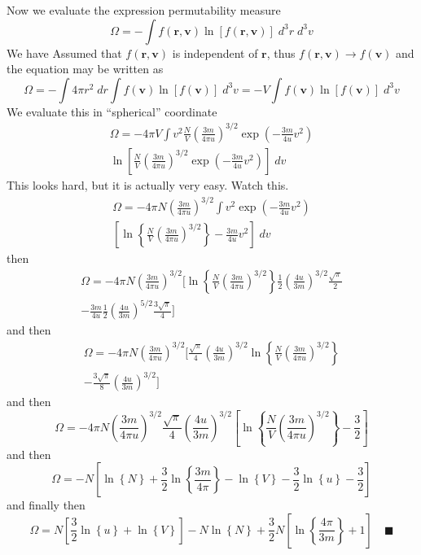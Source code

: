 \documentclass[../../../Main.tex]{subfiles}
\begin{document}
Now we evaluate the expression permutability measure
\begin{equation*}
    \Omega=-\int f(\mathbf{r},\mathbf{v})\ln [f(\mathbf{r},\mathbf{v})]\;d^3r\;d^3v
\end{equation*}
We have Assumed that $f(\mathbf{r},\mathbf{v})$ is independent of $\mathbf{r}$, thus $f(\mathbf{r},\mathbf{v})\rightarrow f(\mathbf{v})$ and the equation may be written as
\begin{equation*}
    \Omega=-\int 4\pi r^2\;dr\int  f( \mathbf{v})\ln [f( \mathbf{v})]\;d^3v=-V\int  f( \mathbf{v}) \ln [f( \mathbf{v})]\;d^3v
\end{equation*}
We evaluate this in \enquote{spherical} coordinate
\begin{multline*}
    \Omega=-4\pi V\int v^2 \frac{N}{V} \left(\frac{3m}{4\pi u}\right)^{3/2}\exp\left(-\frac{3m}{4u}v^2\right)\\
     \ln \left[\frac{N}{V} \left(\frac{3m}{4\pi u}\right)^{3/2}\exp\left(-\frac{3m}{4u}v^2\right)\right]\;dv
\end{multline*}
This looks hard, but it is actually very easy. Watch this.
\begin{multline*}
    \Omega=-4\pi N \left(\frac{3m}{4\pi u}\right)^{3/2}\int v^2 \exp\left(-\frac{3m}{4u}v^2\right)\\
      \left[\ln\left\{\frac{N}{V} \left(\frac{3m}{4\pi u}\right)^{3/2}\right\} -\frac{3m}{4u}v^2\right]\;dv
\end{multline*}
then
\begin{multline*}
    \Omega=-4\pi N \left(\frac{3m}{4\pi u}\right)^{3/2}\Bigg[ \ln\left\{\frac{N}{V} \left(\frac{3m}{4\pi u}\right)^{3/2}\right\} \frac{1}{2}\left(\frac{4u}{3m}\right)^{3/2}\frac{\sqrt{\pi}}{2}\\
    -\frac{3m}{4u}\frac{1}{2}\left(\frac{4u}{3m}\right)^{5/2}\frac{3\sqrt{\pi}}{4}\Bigg]
\end{multline*}
and then
\begin{multline*}
    \Omega=-4\pi N \left(\frac{3m}{4\pi u}\right)^{3/2}\Bigg[\frac{\sqrt{\pi}}{4}\left(\frac{4u}{3m}\right)^{3/2} \ln\left\{\frac{N}{V} \left(\frac{3m}{4\pi u}\right)^{3/2}\right\} \\
    -\frac{3\sqrt{\pi}}{8} \left(\frac{4u}{3m}\right)^{3/2}\Bigg]
\end{multline*}
and then 
\begin{equation*}
    \Omega=-4\pi N \left(\frac{3m}{4\pi u}\right)^{3/2}\frac{\sqrt{\pi}}{4}\left(\frac{4u}{3m}\right)^{3/2} \left[\ln\left\{\frac{N}{V} \left(\frac{3m}{4\pi u}\right)^{3/2}\right\} 
    -\frac{3}{2}\right]
\end{equation*}
and then 
\begin{equation*}
    \Omega=-N\left[\ln\left\{N\right\}+\frac{3}{2}\ln\left\{\frac{3m}{4\pi}\right\} - \ln \left\{V\right\}-\frac{3}{2}\ln\left\{u\right\}-\frac{3}{2}\right]
\end{equation*}
and finally then
\begin{equation*}
    \Omega=N\left[\frac{3}{2}\ln\left\{u\right\}+\ln \left\{V\right\}\right] -N\ln\left\{N\right\}+\frac{3}{2}N\left[\ln\left\{\frac{4\pi}{3m}\right\}+1\right] \quad\blacksquare
\end{equation*}
\end{document}
